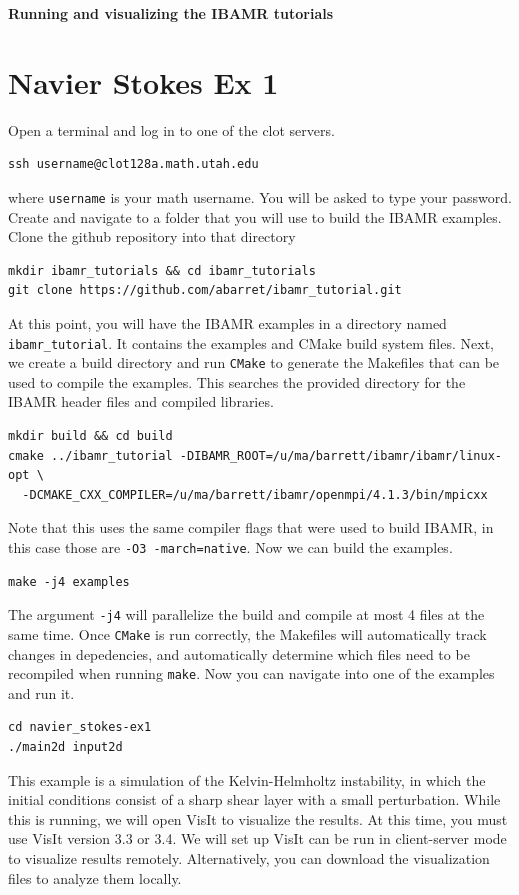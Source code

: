 \documentclass{article}
\begin{document}
\begin{center}
\Large \textbf{Running and visualizing the IBAMR tutorials}
\end{center}
\section{Navier Stokes Ex 1}
Open a terminal and log in to one of the clot servers.
\begin{verbatim}
ssh username@clot128a.math.utah.edu
\end{verbatim}
where \verb|username| is your math username. You will be asked to type your password. Create and navigate to a folder that you will use to build the IBAMR examples. Clone the github repository into that directory
\begin{verbatim}
mkdir ibamr_tutorials && cd ibamr_tutorials
git clone https://github.com/abarret/ibamr_tutorial.git
\end{verbatim}
At this point, you will have the IBAMR examples in a directory named \verb|ibamr_tutorial|. It contains the examples and CMake build system files. Next, we create a build directory and run \verb|CMake| to generate the Makefiles that can be used to compile the examples. This searches the provided directory for the IBAMR header files and compiled libraries.
\begin{verbatim}
mkdir build && cd build
cmake ../ibamr_tutorial -DIBAMR_ROOT=/u/ma/barrett/ibamr/ibamr/linux-opt \
  -DCMAKE_CXX_COMPILER=/u/ma/barrett/ibamr/openmpi/4.1.3/bin/mpicxx
\end{verbatim}
Note that this uses the same compiler flags that were used to build IBAMR, in this case those are \verb|-O3 -march=native|. Now we can build the examples.
\begin{verbatim}
make -j4 examples
\end{verbatim}
The argument \verb|-j4| will parallelize the build and compile at most 4 files at the same time. Once \verb|CMake| is run correctly, the Makefiles will automatically track changes in depedencies, and automatically determine which files need to be recompiled when running \verb|make|. Now you can navigate into one of the examples and run it.
\begin{verbatim}
cd navier_stokes-ex1
./main2d input2d
\end{verbatim}
This example is a simulation of the Kelvin-Helmholtz instability, in which the initial conditions consist of a sharp shear layer with a small perturbation. While this is running, we will open VisIt to visualize the results. At this time, you must use VisIt version 3.3 or 3.4. We will set up VisIt can be run in client-server mode to visualize results remotely. Alternatively, you can download the visualization files to analyze them locally.
\end{document}

